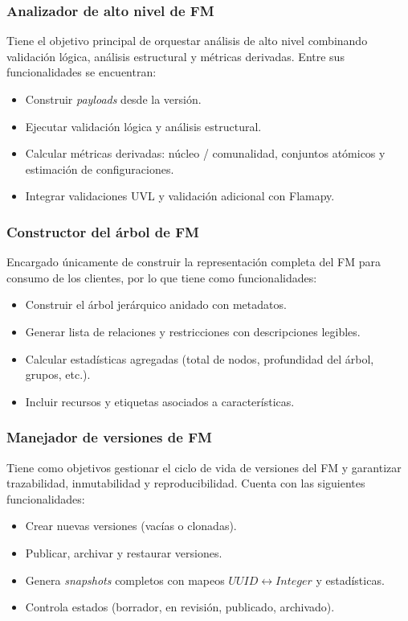 \subsubsection{Analizador de alto nivel de \ac{FM}}

Tiene el objetivo principal de orquestar análisis de alto nivel combinando validación lógica, 
análisis estructural y métricas derivadas. Entre sus funcionalidades se encuentran:
\begin{itemize}
	\item Construir \textit{payloads} desde la versión.
	\item Ejecutar validación lógica y análisis estructural.
	\item Calcular métricas derivadas: núcleo / comunalidad, conjuntos atómicos y estimación de configuraciones.
	\item Integrar validaciones \ac{UVL} y validación adicional con Flamapy.
\end{itemize}

\subsubsection{Constructor del árbol de \ac{FM}}

Encargado únicamente de construir la representación completa del \ac{FM} para consumo de los clientes,
por lo que tiene como funcionalidades:
\begin{itemize}
	\item Construir el árbol jerárquico anidado con metadatos.
	\item Generar lista de relaciones y restricciones con descripciones legibles.
	\item Calcular estadísticas agregadas (total de nodos, profundidad del árbol, grupos, etc.).
	\item Incluir recursos y etiquetas asociados a características.
\end{itemize}

\subsubsection{Manejador de versiones de \ac{FM}}

Tiene como objetivos gestionar el ciclo de vida de versiones del \ac{FM} y
garantizar trazabilidad, inmutabilidad y reproducibilidad. Cuenta con las siguientes funcionalidades:
\begin{itemize}
	\item Crear nuevas versiones (vacías o clonadas).
	\item Publicar, archivar y restaurar versiones.
	\item Genera \textit{snapshots} completos con mapeos $UUID \leftrightarrow Integer$  y estadísticas.
	\item Controla estados (borrador, en revisión, publicado, archivado).
\end{itemize}


